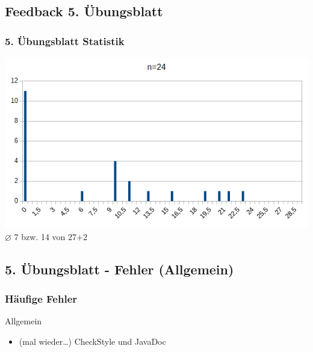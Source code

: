 \documentclass[18pt]{beamer}
\begin{document}
	\subsection{Feedback 5. Übungsblatt}
	\begin{frame}
		\frametitle{5. Übungsblatt Statistik}
		\includegraphics[scale=0.7]{./pics/tut5/statistics-ub5-2.png}
		\linebreak \centering $\diameter$ 7 bzw. 14 von 27+2
	\end{frame}

	\subsection{5. Übungsblatt - Fehler (Allgemein)}
	\begin{frame}
		\frametitle{Häufige Fehler}
		\begin{block}{Allgemein}
			\begin{itemize}
				\item (mal wieder\dots) CheckStyle und JavaDoc
			\end{itemize}
		\end{block}
	\end{frame}
\end{document}
